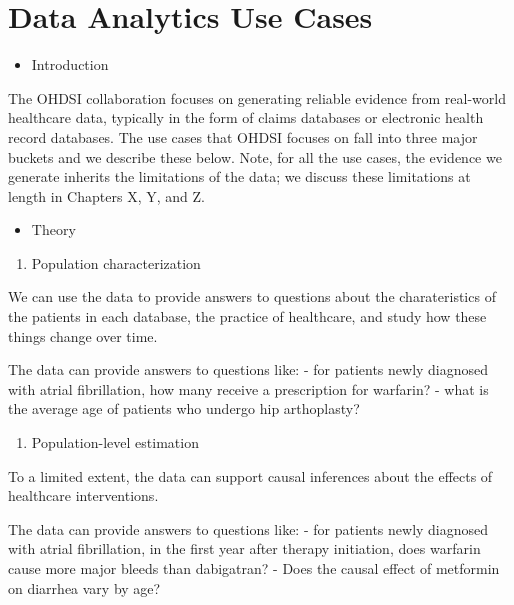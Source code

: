 \documentclass[]{book}
\providecommand{\tightlist}{%
  \setlength{\itemsep}{0pt}\setlength{\parskip}{0pt}}
\begin{document}
\chapter{Data Analytics Use Cases}\label{DataAnalyticsUseCases}

\begin{itemize}
\tightlist
\item
  Introduction
\end{itemize}

The OHDSI collaboration focuses on generating reliable evidence from
real-world healthcare data, typically in the form of claims databases or
electronic health record databases. The use cases that OHDSI focuses on
fall into three major buckets and we describe these below. Note, for all
the use cases, the evidence we generate inherits the limitations of the
data; we discuss these limitations at length in Chapters X, Y, and Z.

\begin{itemize}
\tightlist
\item
  Theory
\end{itemize}

\begin{enumerate}
\def\labelenumi{\arabic{enumi}.}
\tightlist
\item
  Population characterization
\end{enumerate}

We can use the data to provide answers to questions about the
charateristics of the patients in each database, the practice of
healthcare, and study how these things change over time.

The data can provide answers to questions like: - for patients newly
diagnosed with atrial fibrillation, how many receive a prescription for
warfarin? - what is the average age of patients who undergo hip
arthoplasty?

\begin{enumerate}
\def\labelenumi{\arabic{enumi}.}
\setcounter{enumi}{1}
\tightlist
\item
  Population-level estimation
\end{enumerate}

To a limited extent, the data can support causal inferences about the
effects of healthcare interventions.

The data can provide answers to questions like: - for patients newly
diagnosed with atrial fibrillation, in the first year after therapy
initiation, does warfarin cause more major bleeds than dabigatran? -
Does the causal effect of metformin on diarrhea vary by age?
\end{document}

